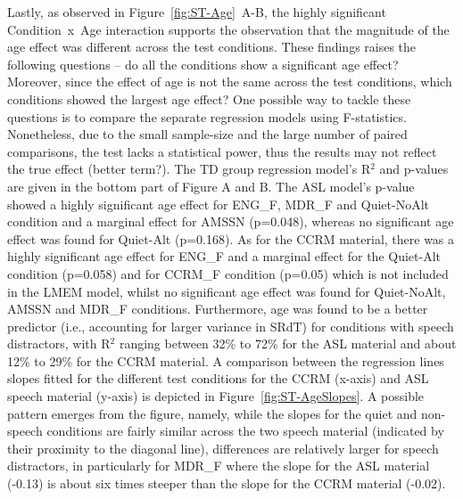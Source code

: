 \documentclass[a4paper, twoside]{templates/ociamthesis}
\begin{document}
Lastly, as observed in Figure~\ref{fig:ST-Age}~A-B, the highly significant Condition~x~Age interaction supports the observation that the magnitude of the age effect was different across the test conditions. These findings raises the following questions -- do all the conditions show a significant age effect? Moreover, since the effect of age is not the same across the test conditions, which conditions showed the largest age effect? One possible way to tackle these questions is to compare the separate regression models using F-statistics. Nonetheless, due to the small sample-size and the large number of paired comparisons, the test lacks a statistical power, thus the results may not reflect the true effect (better term?). The TD group regression model's R\(^{2}\) and p-values are given in the bottom part of Figure A and B. The ASL model's p-value showed a highly significant age effect for ENG\_F, MDR\_F and Quiet-NoAlt condition and a marginal effect for AMSSN (p=0.048), whereas no significant age effect was found for Quiet-Alt (p=0.168). As for the CCRM material, there was a highly significant age effect for ENG\_F and a marginal effect for the Quiet-Alt condition (p=0.058) and for CCRM\_F condition (p=0.05) which is not included in the LMEM model, whilst no significant age effect was found for Quiet-NoAlt, AMSSN and MDR\_F conditions. Furthermore, age was found to be a better predictor (i.e., accounting for larger variance in SRdT) for conditions with speech distractors, with R\(^{2}\) ranging between 32\% to 72\% for the ASL material and about 12\% to 29\% for the CCRM material. A comparison between the regression lines slopes fitted for the different test conditions for the CCRM (x-axis) and ASL speech material (y-axis) is depicted in Figure~\ref{fig:ST-AgeSlopes}. A possible pattern emerges from the figure, namely, while the slopes for the quiet and non-speech conditions are fairly similar across the two speech material (indicated by their proximity to the diagonal line), differences are relatively larger for speech distractors, in particularly for MDR\_F where the slope for the ASL material (-0.13) is about six times steeper than the slope for the CCRM material (-0.02).
\end{document}
